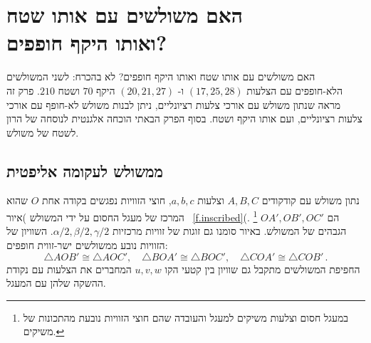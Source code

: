 


\chapter[\R{האם משולשים עם אותו שטח ואותו היקף חופפים?}]{האם משולשים עם אותו שטח\\
ואותו היקף חופפים?}
\label{c.congruent}


האם משולשים עם אותו שטח ואותו היקף חופפים? לא בהכרח: לשני המשולשים הלא-חופפים עם הצלעות
$(17,25,28)$
ו-%
$(20,21,27)$
היקף
$70$
ושטח 
$210$.
פרק זה מראה שנתון משולש עם אורכי צלעות רציונליים, ניתן לבנות משולש לא-חופף עם אורכי צלעות רציונליים, ועם אותו היקף ושטח.
בסוף הפרק הבאתי הוכחה אלגנטית לנוסחה של הרון לשטח של משולש.


\section{ממשולש לעקומה אליפטית}

נתון משולש עם קודקודים
$A,B,C$
וצלעות
$a,b,c$,
חוצי הזוויות נפגשים בקודה אחת
$O$
שהוא המרכז של מעגל החסום על ידי המשולש )איור~%
\ref{f.inscribed}(.%
\footnote{במעגל חסום וצלעות משיקים למעגל והעובדה שהם חוצי הזוויות נובעת מהתכונות של משיקים.}
$OA',OB',OC'$
הם הגבהים של המשולש. באיור סומנו גם זוגות של זוויות מרכזיות
$\alpha/2,\beta/2,\gamma/2$.
השוויון של הזוויות נובע ממשולשים ישר-זווית חופפים:
\[
\triangle AOB'\cong \triangle AOC',\quad \triangle BOA'\cong \triangle BOC', \quad \triangle COA'\cong \triangle COB'\,.
\]
החפיפת המשולשים מתקבל גם שוויון בין קטעי הקו 
$u,v,w$
המחברים את הצלעות עם נקודת ההשקה שלהן עם המעגל.



